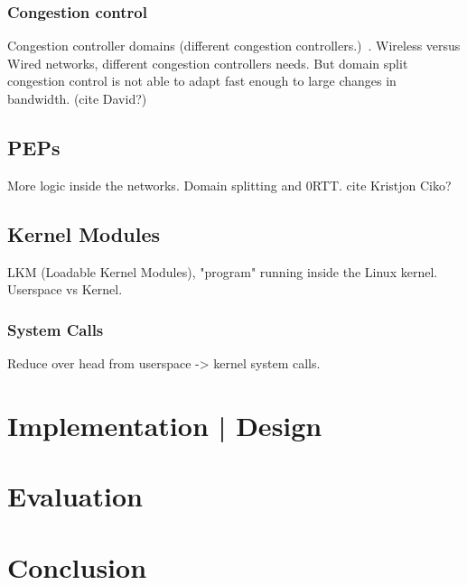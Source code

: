 \documentclass[a4paper,english, 11pt]{report}
\begin{document}
\subsection{Congestion control}
Congestion controller domains (different congestion controllers.)~\cite{rfc5783}.
Wireless versus Wired networks, different congestion controllers needs.
But domain split congestion control is not able to adapt fast enough to large changes in bandwidth. (cite David?)


\section{PEPs}
More logic inside the networks. Domain splitting and 0RTT. {cite Kristjon Ciko?}

\section{Kernel Modules}
LKM (Loadable Kernel Modules), "program" running inside the Linux kernel.
Userspace vs Kernel.
\subsection{System Calls}
Reduce over head from userspace -> kernel system calls.

\chapter{Implementation | Design}
\chapter{Evaluation}
\chapter{Conclusion}

{}

\end{document}
